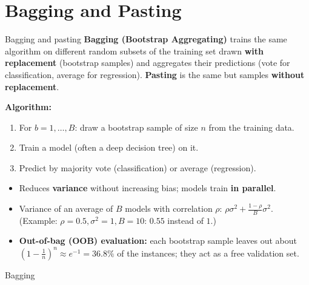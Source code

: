 \section{Bagging and Pasting}
\begin{dfn}{Bagging and pasting}
\textbf{Bagging (Bootstrap Aggregating)} trains the same algorithm on different random subsets of the training set drawn \textbf{with replacement} (bootstrap samples) and aggregates their predictions (vote for classification, average for regression). \textbf{Pasting} is the same but samples \textbf{without replacement}.
\end{dfn}
\textbf{Algorithm:}
\begin{enumerate}
  \item For $b=1,\dots,B$: draw a bootstrap sample of size $n$ from the training data.
  \item Train a model (often a deep decision tree) on it.
  \item Predict by majority vote (classification) or average (regression).
\end{enumerate}
\begin{itemize}
  \item Reduces \textbf{variance} without increasing bias; models train \textbf{in parallel}.
  \item Variance of an average of $B$ models with correlation $\rho$: $\rho\sigma^2+\frac{1-\rho}{B}\sigma^2$. (Example: $\rho=0.5,\sigma^2=1,B=10$: $0.55$ instead of $1$.)
  \item \textbf{Out-of-bag (OOB) evaluation:} each bootstrap sample leaves out about $(1-\frac1n)^n\approx e^{-1}=\mathbf{36.8\%}$ of the instances; they act as a free validation set.
\end{itemize}

\begin{drawit}{Bagging}
\centering
{}
\end{drawit}


